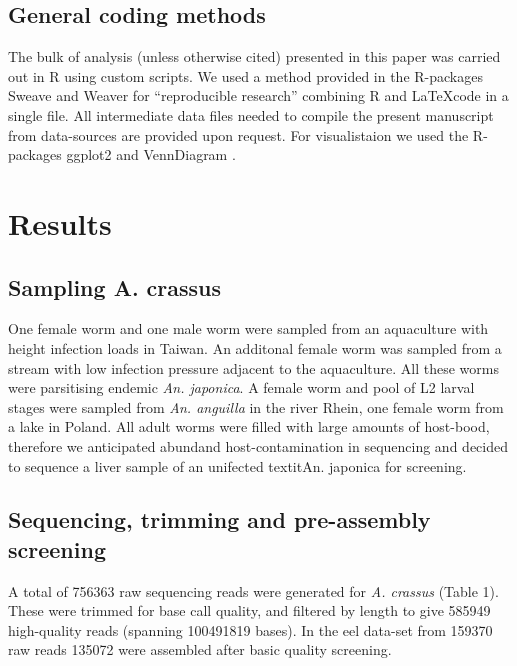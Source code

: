 \documentclass[10pt]{bmc_article}
\newenvironment{bmcformat}{\begin{raggedright}\baselineskip20pt\sloppy\setboolean{publ}{false}}{\end{raggedright}\baselineskip20pt\sloppy}
\begin{document}
\begin{bmcformat}
\subsection*{General coding methods}

The bulk of analysis (unless otherwise cited) presented in this paper
was carried out in R \cite{R_project} using custom scripts. We used a
method provided in the R-packages
Sweave\cite{lmucs-papers:Leisch:2002} and Weaver\cite{weaver} for
``reproducible research'' combining R and \LaTeX code in a single
file. All intermediate data files needed to compile the present
manuscript from data-sources are provided upon request. For
visualistaion we used the R-packages ggplot2 \cite{ggplot-book} and
VennDiagram \cite{pmid21269502}.


\section*{Results}


\subsection*{Sampling A. crassus}

One female worm and one male worm were sampled from an aquaculture
with height infection loads in Taiwan. An additonal female worm was
sampled from a stream with low infection pressure adjacent to the
aquaculture. All these worms were parsitising endemic
\textit{An. japonica}. A female worm and pool of L2 larval stages were
sampled from \textit{An. anguilla} in the river Rhein, one female worm
from a lake in Poland. All adult worms were filled with large amounts
of host-bood, therefore we anticipated abundand host-contamination in
sequencing and decided to sequence a liver sample of an unifected
textit{An. japonica} for screening.

 \subsection*{Sequencing, trimming and pre-assembly screening}






A total of 756363 raw sequencing reads were
generated for \textit{A. crassus} (Table 1). These were trimmed for
base call quality, and filtered by length to give
585949 high-quality reads (spanning
100491819 bases). In the eel data-set
from 159370 raw reads 135072 were
assembled after basic quality screening.


\end{bmcformat}
\end{document}
